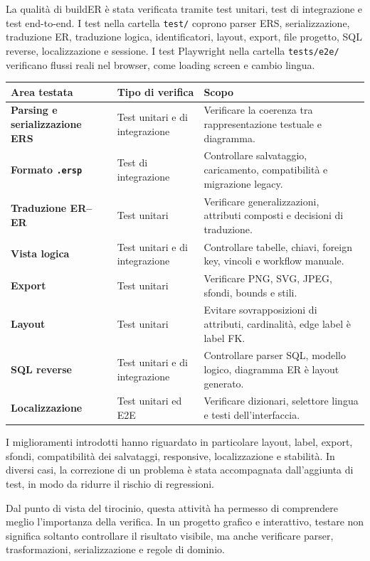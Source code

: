 \documentclass{unipd-thesis-modern}
\newcommand{\builder}{buildER}
\begin{document}
La qualità di \builder{} è stata verificata tramite test unitari, test di integrazione e test end-to-end. I test nella cartella \texttt{test/} coprono parser ERS, serializzazione, traduzione ER, traduzione logica, identificatori, layout, export, file progetto, SQL reverse, localizzazione e sessione. I test Playwright nella cartella \texttt{tests/e2e/} verificano flussi reali nel browser, come loading screen e cambio lingua.

\begin{table}[htbp]
\centering
\scriptsize
\begin{tabularx}{\textwidth}{>{\bfseries}p{3.2cm}p{3.4cm}X}
\toprule
Area testata & Tipo di verifica & Scopo \\
\midrule
Parsing e serializzazione ERS & Test unitari e di integrazione & Verificare la coerenza tra rappresentazione testuale e diagramma. \\
Formato \texttt{.ersp} & Test di integrazione & Controllare salvataggio, caricamento, compatibilità e migrazione legacy. \\
Traduzione ER--ER & Test unitari & Verificare generalizzazioni, attributi composti e decisioni di traduzione. \\
Vista logica & Test unitari e di integrazione & Controllare tabelle, chiavi, foreign key, vincoli e workflow manuale. \\
Export & Test unitari & Verificare PNG, SVG, JPEG, sfondi, bounds e stili. \\
Layout & Test unitari & Evitare sovrapposizioni di attributi, cardinalità, edge label è label FK. \\
SQL reverse & Test unitari e di integrazione & Controllare parser SQL, modello logico, diagramma ER è layout generato. \\
Localizzazione & Test unitari ed E2E & Verificare dizionari, selettore lingua e testi dell'interfaccia. \\
\bottomrule
\end{tabularx}
\end{table}

I miglioramenti introdotti hanno riguardato in particolare layout, label, export, sfondi, compatibilità dei salvataggi, responsive, localizzazione e stabilità. In diversi casi, la correzione di un problema è stata accompagnata dall'aggiunta di test, in modo da ridurre il rischio di regressioni.

Dal punto di vista del tirocinio, questa attività ha permesso di comprendere meglio l'importanza della verifica. In un progetto grafico e interattivo, testare non significa soltanto controllare il risultato visibile, ma anche verificare parser, trasformazioni, serializzazione e regole di dominio.
\end{document}
